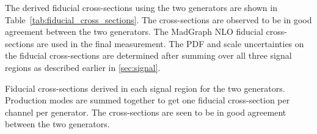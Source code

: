 The derived fiducial cross-sections using the two generators are 
shown in Table~\ref{tab:fiducial_cross_sections}.  The cross-sections are observed
to be in good agreement between the two generators. The MadGraph NLO
fiducial cross-sections are used in the final measurement.
The PDF and scale uncertainties on the fiducial cross-sections
are determined after summing over all three signal regions 
as described earlier in \sec\ref{sec:signal}.





\begin{table}[ht!]
\centering
\begin{footnotesize}

\end{footnotesize}
\caption{Fiducial cross-sections derived in each signal region for the two 
generators. Production modes are summed together to get one fiducial 
cross-section per channel per generator. The cross-sections are seen to 
be in good agreement between the two generators.}
\label{tab:fiducial_cross_sections}
\end{table}
